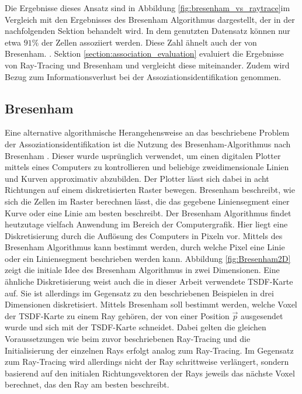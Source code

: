 Die Ergebnisse dieses Ansatz sind in Abbildung \ref{fig:bresenham_vs_raytrace}im Vergleich mit den Ergebnisses des Bresenham Algorithmus dargestellt, der in der nachfolgenden Sektion behandelt wird. In dem genutzten Datensatz können nur etwa $91\%$ der Zellen assoziiert werden. Diese Zahl ähnelt auch der von Bresenham. . Sektion \ref{section:association_evaluation} evaluiert die Ergebnisse von Ray-Tracing und Bresenham und vergleicht diese miteinander. Zudem wird Bezug zum Informationsverlust bei der Assoziationsidentifikation genommen.




\subsection{Bresenham}

Eine alternative algorithmische Herangehensweise an das beschriebene Problem der Assoziationsidentifikation ist die Nutzung des Bresenham-Algorithmus nach Bresenham \cite{bresenham1965algorithm}. Dieser wurde usprünglich verwendet, um einen digitalen Plotter mittels eines Computers zu kontrollieren und beliebige zweidimensionale Linien und Kurven approximativ abzubilden. Der Plotter lässt sich dabei in acht Richtungen auf einem diskretisierten Raster bewegen. Bresenham \cite{bresenham1965algorithm} beschreibt, wie sich die Zellen im Raster berechnen lässt, die das gegebene Liniensegment einer Kurve oder eine Linie am besten beschreibt. Der Bresenham Algorithmus findet heutzutage vielfach Anwendung im Bereich der Computergrafik. Hier liegt eine Diskretisierung durch die Auflösung des Computers in Pixeln vor. Mittels des Bresenham Algorithmus kann bestimmt werden, durch welche Pixel eine Linie oder ein Liniensegment beschrieben werden kann. Abbildung \ref{fig:Bresenham2D} zeigt die initiale Idee des Bresenham Algorithmus in zwei Dimensionen. Eine ähnliche Diskretisierung weist auch die in dieser Arbeit verwendete TSDF-Karte auf. Sie ist allerdings im Gegensatz zu den beschriebenen Beispielen in drei Dimensionen diskretisiert. Mittels Bresenham soll bestimmt werden, welche Voxel der TSDF-Karte zu einem Ray gehören, der von einer Position $\vec{p}$ ausgesendet wurde und sich mit der TSDF-Karte schneidet. Dabei gelten die gleichen Voraussetzungen wie beim zuvor beschriebenen Ray-Tracing und die Initialisierung der einzelnen Rays erfolgt analog zum Ray-Tracing. Im Gegensatz zum Ray-Tracing wird allerdings nicht der Ray schrittweise verlängert, sondern basierend auf den initialen Richtungsvektoren der Rays jeweils das nächste Voxel berechnet, das den Ray am besten beschreibt.

